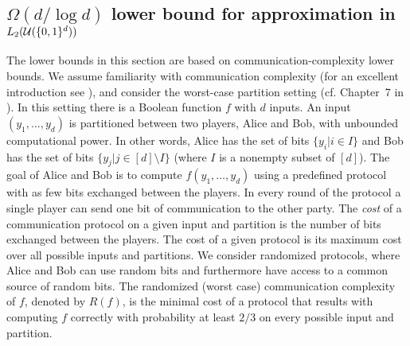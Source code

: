 \documentclass[11pt]{article}
\newcommand{\cu}{{\cal U}}
\begin{document}
\subsection{$\Omega(d/\log d)$ lower bound for approximation in $L_2(\cu(\{0,1\}^d))$}

The lower bounds in this section are based on communication-complexity lower bounds.
We assume familiarity with communication complexity (for an excellent introduction see \cite{kushilevitz1997communication}), 
and consider the worst-case partition setting 
(cf. Chapter~7 in \cite{kushilevitz1997communication}). In this setting there is a Boolean function $f$ with $d$ inputs.
An input $(y_1,...,y_d)$ is partitioned between two players, Alice and Bob, with unbounded computational power. In other words, Alice has the set of bits $\{y_i|i \in I\}$
and Bob has the set of bits $\{y_j|j \in [d]\setminus I\}$ (where $I$ is a nonempty subset of $[d]$).
The goal of Alice and Bob is to compute $f(y_1, \ldots ,y_d)$ using a predefined protocol with as few bits exchanged between the players.
In every round of the protocol a single player can send one bit of communication to the other party. The \emph{cost} of a communication protocol on a given input and partition is the number of bits exchanged between the players.
The cost of a given protocol is its maximum cost over all possible inputs and partitions.
We consider randomized protocols, where Alice and Bob can use random bits and furthermore have access to a common source of random bits.
The randomized (worst case) communication complexity of $f$, denoted by $R(f)$, is the minimal cost of a protocol that results with computing $f$
correctly with probability at least $2/3$ on every possible input 
and partition.
\end{document}
